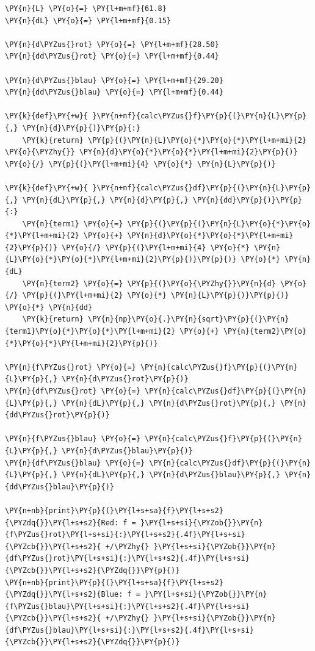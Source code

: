     \begin{tcolorbox}[breakable, size=fbox, boxrule=1pt, pad at break*=1mm,colback=cellbackground, colframe=cellborder]
\begin{Verbatim}[commandchars=\\\{\}]
\PY{n}{L} \PY{o}{=} \PY{l+m+mf}{61.8}
\PY{n}{dL} \PY{o}{=} \PY{l+m+mf}{0.15}

\PY{n}{d\PYZus{}rot} \PY{o}{=} \PY{l+m+mf}{28.50}
\PY{n}{dd\PYZus{}rot} \PY{o}{=} \PY{l+m+mf}{0.44}

\PY{n}{d\PYZus{}blau} \PY{o}{=} \PY{l+m+mf}{29.20}
\PY{n}{dd\PYZus{}blau} \PY{o}{=} \PY{l+m+mf}{0.44}

\PY{k}{def}\PY{+w}{ }\PY{n+nf}{calc\PYZus{}f}\PY{p}{(}\PY{n}{L}\PY{p}{,} \PY{n}{d}\PY{p}{)}\PY{p}{:}
    \PY{k}{return} \PY{p}{(}\PY{n}{L}\PY{o}{*}\PY{o}{*}\PY{l+m+mi}{2} \PY{o}{\PYZhy{}} \PY{n}{d}\PY{o}{*}\PY{o}{*}\PY{l+m+mi}{2}\PY{p}{)} \PY{o}{/} \PY{p}{(}\PY{l+m+mi}{4} \PY{o}{*} \PY{n}{L}\PY{p}{)}

\PY{k}{def}\PY{+w}{ }\PY{n+nf}{calc\PYZus{}df}\PY{p}{(}\PY{n}{L}\PY{p}{,} \PY{n}{dL}\PY{p}{,} \PY{n}{d}\PY{p}{,} \PY{n}{dd}\PY{p}{)}\PY{p}{:}
    \PY{n}{term1} \PY{o}{=} \PY{p}{(}\PY{p}{(}\PY{n}{L}\PY{o}{*}\PY{o}{*}\PY{l+m+mi}{2} \PY{o}{+} \PY{n}{d}\PY{o}{*}\PY{o}{*}\PY{l+m+mi}{2}\PY{p}{)} \PY{o}{/} \PY{p}{(}\PY{l+m+mi}{4} \PY{o}{*} \PY{n}{L}\PY{o}{*}\PY{o}{*}\PY{l+m+mi}{2}\PY{p}{)}\PY{p}{)} \PY{o}{*} \PY{n}{dL}
    \PY{n}{term2} \PY{o}{=} \PY{p}{(}\PY{o}{\PYZhy{}}\PY{n}{d} \PY{o}{/} \PY{p}{(}\PY{l+m+mi}{2} \PY{o}{*} \PY{n}{L}\PY{p}{)}\PY{p}{)} \PY{o}{*} \PY{n}{dd}
    \PY{k}{return} \PY{n}{np}\PY{o}{.}\PY{n}{sqrt}\PY{p}{(}\PY{n}{term1}\PY{o}{*}\PY{o}{*}\PY{l+m+mi}{2} \PY{o}{+} \PY{n}{term2}\PY{o}{*}\PY{o}{*}\PY{l+m+mi}{2}\PY{p}{)}

\PY{n}{f\PYZus{}rot} \PY{o}{=} \PY{n}{calc\PYZus{}f}\PY{p}{(}\PY{n}{L}\PY{p}{,} \PY{n}{d\PYZus{}rot}\PY{p}{)}
\PY{n}{df\PYZus{}rot} \PY{o}{=} \PY{n}{calc\PYZus{}df}\PY{p}{(}\PY{n}{L}\PY{p}{,} \PY{n}{dL}\PY{p}{,} \PY{n}{d\PYZus{}rot}\PY{p}{,} \PY{n}{dd\PYZus{}rot}\PY{p}{)}

\PY{n}{f\PYZus{}blau} \PY{o}{=} \PY{n}{calc\PYZus{}f}\PY{p}{(}\PY{n}{L}\PY{p}{,} \PY{n}{d\PYZus{}blau}\PY{p}{)}
\PY{n}{df\PYZus{}blau} \PY{o}{=} \PY{n}{calc\PYZus{}df}\PY{p}{(}\PY{n}{L}\PY{p}{,} \PY{n}{dL}\PY{p}{,} \PY{n}{d\PYZus{}blau}\PY{p}{,} \PY{n}{dd\PYZus{}blau}\PY{p}{)}

\PY{n+nb}{print}\PY{p}{(}\PY{l+s+sa}{f}\PY{l+s+s2}{\PYZdq{}}\PY{l+s+s2}{Red: f = }\PY{l+s+si}{\PYZob{}}\PY{n}{f\PYZus{}rot}\PY{l+s+si}{:}\PY{l+s+s2}{.4f}\PY{l+s+si}{\PYZcb{}}\PY{l+s+s2}{ +/\PYZhy{} }\PY{l+s+si}{\PYZob{}}\PY{n}{df\PYZus{}rot}\PY{l+s+si}{:}\PY{l+s+s2}{.4f}\PY{l+s+si}{\PYZcb{}}\PY{l+s+s2}{\PYZdq{}}\PY{p}{)}
\PY{n+nb}{print}\PY{p}{(}\PY{l+s+sa}{f}\PY{l+s+s2}{\PYZdq{}}\PY{l+s+s2}{Blue: f = }\PY{l+s+si}{\PYZob{}}\PY{n}{f\PYZus{}blau}\PY{l+s+si}{:}\PY{l+s+s2}{.4f}\PY{l+s+si}{\PYZcb{}}\PY{l+s+s2}{ +/\PYZhy{} }\PY{l+s+si}{\PYZob{}}\PY{n}{df\PYZus{}blau}\PY{l+s+si}{:}\PY{l+s+s2}{.4f}\PY{l+s+si}{\PYZcb{}}\PY{l+s+s2}{\PYZdq{}}\PY{p}{)}
\end{Verbatim}
\end{tcolorbox}

